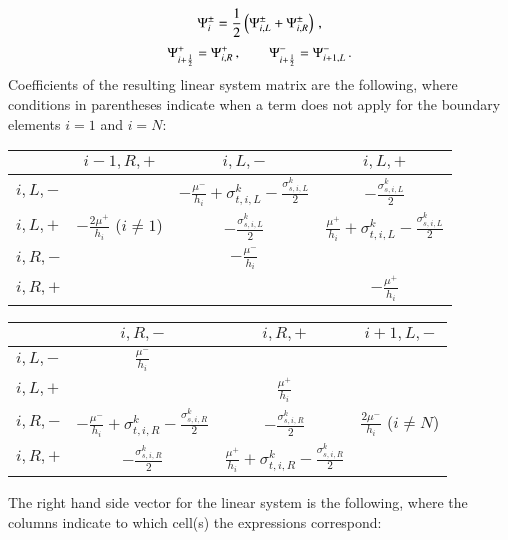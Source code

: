 \documentclass[preprint,12pt]{elsarticle}
\newcommand{\sigsL}{\frac{\sigma_{s,i,L}^k}{2}}
\newcommand{\sigsR}{\frac{\sigma_{s,i,R}^k}{2}}
\newcommand{\sigtL}{\sigma_{t,i,L}^k}
\newcommand{\sigtR}{\sigma_{t,i,R}^k}
\begin{document}
\begin{equation}
  \Psi_i^\pm=\frac{1}{2}\left( \Psi_{i,L}^\pm + \Psi_{i,R}^\pm \right) \, ,
\end{equation}
\begin{equation}
  \Psi_{i+\frac{1}{2}}^+=\Psi_{i,R}^+ \, ,\qquad \Psi_{i+\frac{1}{2}}^-=\Psi_{i+1,L}^- \, .
\end{equation}
Coefficients of the resulting linear system matrix are the following,
where conditions in parentheses indicate when a term does not
apply for the boundary elements $i=1$ and $i=N$:
\begin{center}
\begin{tabular}{|l||c|c|c|}\hline
          & $i-1,R,+$ & $i,L,-$ & $i,L,+$\\\hline\hline
  $i,L,-$ &
          & $-\frac{\mu^-}{h_i} + \sigtL - \sigsL$
          & $-\sigsL$ \\\hline
  $i,L,+$ & $-\frac{2\mu^+}{h_i}$ ($i\ne 1$)
          & $-\sigsL$
          & $\frac{\mu^+}{h_i} + \sigtL - \sigsL$ \\\hline
  $i,R,-$ &
          & $-\frac{\mu^-}{h_i}$
          & \\\hline
  $i,R,+$ &
          &
          & $-\frac{\mu^+}{h_i}$ \\\hline
\end{tabular}
\end{center}
\begin{center}
\begin{tabular}{|l||c|c|c|}\hline
          & $i,R,-$ & $i,R,+$ & $i+1,L,-$\\\hline\hline
  $i,L,-$ & $\frac{\mu^-}{h_i}$
          &
          & \\\hline
  $i,L,+$ &
          & $\frac{\mu^+}{h_i}$
          & \\\hline
  $i,R,-$ & $-\frac{\mu^-}{h_i} + \sigtR - \sigsR$
          & $-\sigsR$
          & $\frac{2\mu^-}{h_i}$ ($i\ne N$) \\\hline
  $i,R,+$ & $-\sigsR$
          & $\frac{\mu^+}{h_i} + \sigtR - \sigsR$
          & \\\hline
\end{tabular}
\end{center}
The right hand side vector for the linear system is the following,
where the columns indicate to which cell(s) the expressions
correspond:
\end{document}
